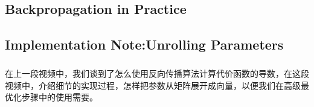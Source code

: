 \documentclass{article}
\begin{document}
\begin{CJK}{UTF8}{gbsn}
\section{Backpropagation in Practice}
\subsection{Implementation Note:Unrolling Parameters}
\subparagraph{}
在上一段视频中，我们谈到了怎么使用反向传播算法计算代价函数的导数，在这段视频中，介绍细节的实现过程，怎样把参数从矩阵展开成向量，以便我们在高级最优化步骤中的使用需要。
\begin{figure}[H]
\label{fig:530}
\end{figure}
\begin{figure}[H]
\label{fig:531}
\end{figure}
\begin{figure}[H]
\label{fig:535}
\end{figure}
\begin{figure}[H]
\label{fig:536}
\end{figure}

\end{CJK}
\end{document}
